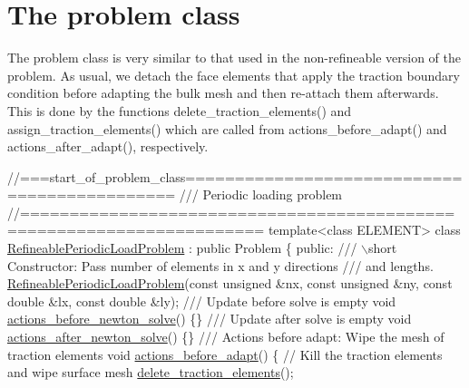 

\hypertarget{index_problem}{}\section{The problem class}\label{index_problem}
The problem class is very similar to that used in the non-\/refineable version of the problem. As usual, we detach the face elements that apply the traction boundary condition before adapting the bulk mesh and then re-\/attach them afterwards. This is done by the functions {\ttfamily delete\+\_\+traction\+\_\+elements()} and {\ttfamily assign\+\_\+traction\+\_\+elements()} which are called from {\ttfamily actions\+\_\+before\+\_\+adapt()} and {\ttfamily actions\+\_\+after\+\_\+adapt()}, respectively.

 
\begin{DoxyCodeInclude}
\textcolor{comment}{//===start\_of\_problem\_class=============================================}
\textcolor{comment}{/// Periodic loading problem}
\textcolor{comment}{}\textcolor{comment}{//======================================================================}
\textcolor{keyword}{template}<\textcolor{keyword}{class} ELEMENT>
\textcolor{keyword}{class }\hyperlink{classRefineablePeriodicLoadProblem}{RefineablePeriodicLoadProblem} : \textcolor{keyword}{public} Problem
\{
\textcolor{keyword}{public}:
\textcolor{comment}{}
\textcolor{comment}{ /// \(\backslash\)short Constructor: Pass number of elements in x and y directions }
\textcolor{comment}{ /// and lengths.}
\textcolor{comment}{} \hyperlink{classRefineablePeriodicLoadProblem_ae950fdcf80e684eddb29358e1f9a3412}{RefineablePeriodicLoadProblem}(\textcolor{keyword}{const} \textcolor{keywordtype}{unsigned} &nx, \textcolor{keyword}{const} \textcolor{keywordtype}{unsigned} &ny, 
                               \textcolor{keyword}{const} \textcolor{keywordtype}{double} &lx, \textcolor{keyword}{const} \textcolor{keywordtype}{double} &ly);
\textcolor{comment}{}
\textcolor{comment}{ /// Update before solve is empty}
\textcolor{comment}{} \textcolor{keywordtype}{void} \hyperlink{classRefineablePeriodicLoadProblem_aece9eef8c0bf14527ea1fb6902820cb4}{actions\_before\_newton\_solve}() \{\}
\textcolor{comment}{}
\textcolor{comment}{ /// Update after solve is empty}
\textcolor{comment}{} \textcolor{keywordtype}{void} \hyperlink{classRefineablePeriodicLoadProblem_a5b1bd71066266f1eb1cc36d524d57894}{actions\_after\_newton\_solve}() \{\}
\textcolor{comment}{}
\textcolor{comment}{ /// Actions before adapt: Wipe the mesh of traction elements}
\textcolor{comment}{} \textcolor{keywordtype}{void} \hyperlink{classRefineablePeriodicLoadProblem_aae144ae04342a103a870d9dfbf29c188}{actions\_before\_adapt}()
  \{
   \textcolor{comment}{// Kill the traction elements and wipe surface mesh}
   \hyperlink{classRefineablePeriodicLoadProblem_a491998bff6616edaa5e29bf155d0284b}{delete\_traction\_elements}();
   

\end{DoxyCodeInclude}
